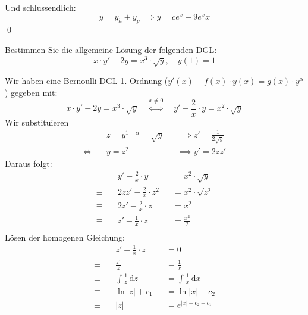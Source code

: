 \documentclass[answers]{exam}
\newcommand{\abs}[1]{\left| #1 \right|}
\renewcommand{\d}{\,\mathrm{d}}
\begin{document}
\begin{questions}
\begin{parts}
\begin{solution}
            Und schlussendlich:
            $$
                y = y_h + y_p \implies y = ce^x + 9e^xx
            $$\qed
        \end{solution}
    \end{parts}

    \newpage
    \question
    Bestimmen Sie die allgemeine Lösung der folgenden DGL:
    $$
        x \cdot y'-2y = x^3 \cdot \sqrt{y}, \quad y(1) = 1
    $$
    \begin{solution}
        Wir haben eine Bernoulli-DGL 1. Ordnung ($y'(x) + f(x) \cdot y(x) = g(x) \cdot y^\alpha$) gegeben mit:
        $$
            x \cdot y'-2y = x^3 \cdot \sqrt{y} \quad \overset{x\neq 0}{\iff} \quad  y' - \frac{2}{x} \cdot y = x^2 \cdot \sqrt{y}
        $$
        Wir substituieren
        $$
            \begin{aligned}
                           & z = y^{1-\alpha} = \sqrt{y} &  & \implies z' = \frac{1}{2\sqrt{y}} \\
                \iff \quad & y = z^2                     &  & \implies y' = 2zz'
            \end{aligned}
        $$
        Daraus folgt:
        $$
            \begin{aligned}
                             & y' - \frac{2}{x} \cdot y     &  & = x^2 \cdot \sqrt{y}   \\
                \equiv \quad & 2zz' - \frac{2}{x} \cdot z^2 &  & = x^2 \cdot \sqrt{z^2} \\
                \equiv \quad & 2z' - \frac{2}{x} \cdot z    &  & = x^2                  \\
                \equiv \quad & z' - \frac{1}{x} \cdot z     &  & = \frac{x^2}{2}        \\
            \end{aligned}
        $$
        Lösen der homogenen Gleichung:
        $$
            \begin{aligned}
                             & z' - \frac{1}{x} \cdot z &  & = 0                       \\
                \equiv \quad & \frac{z'}{z}             &  & = \frac{1}{x}             \\
                \equiv \quad & \int \frac{1}{z} \d z    &  & = \int \frac{1}{x} \d x   \\
                \equiv \quad & \ln \abs{z} + c_1        &  & = \ln \abs{x} + c_2       \\
                \equiv \quad & \abs{z}                  &  & = e^{\abs{x} + c_2 - c_1} \\

\end{aligned}$$
\end{solution}
\end{questions}
\end{document}
